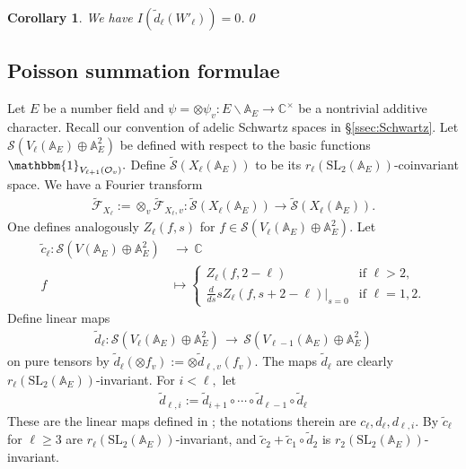\documentclass[11pt,a4paper,reqno]{amsart}
\newtheorem{cor}[thm]{Corollary}
\theoremstyle{remark}
\numberwithin{equation}{section}
\newcommand{\A}{\mathbb{A}}
\newcommand{\SL}{\mathrm{SL}}
\newcommand{\lto}{\,\longrightarrow\,}
\newcommand{\lmto}{\longmapsto}
\newcommand{\OO}{\mathcal{O}}
\newcommand{\CC}{\mathbb{C}}
\theoremstyle{definition}
\numberwithin{equation}{section}
\newcommand{\one}{\mathbbm{1}}
\begin{document}
\begin{cor}\label{eq:dvanish}
    We have $I(\tilde{d}_\ell(W'_\ell))=0$.\qed
\end{cor}




\subsection{Poisson summation formulae}

Let $E$ be a number field and $\psi=\otimes \psi_v:E\backslash \A_E\to \CC^\times$ be a nontrivial additive character. Recall our convention of adelic Schwartz spaces in \S \ref{ssec:Schwartz}. Let $\mathcal{S}(V_{\ell}(\A_E)\oplus \A_E^2)$ be defined with respect to the basic functions $\one_{V_{\ell+1}(\OO_v)}.$ Define $\widetilde{\mathcal{S}}(X_{\ell}(\A_E))$ to be its $r_\ell(\SL_2(\A_E))$-coinvariant space. We have a Fourier transform
\begin{align*}
    \widetilde{\mathcal{F}}_{X_\ell}:=\otimes_v \widetilde{\mathcal{F}}_{X_\ell,v}:\widetilde{\mathcal{S}}(X_{\ell}(\A_E))\longrightarrow\widetilde{\mathcal{S}}(X_{\ell}(\A_E)).
\end{align*}
One defines analogously $Z_{\ell}(f,s)$ for $f\in \mathcal{S}(V_{\ell}(\A_E)\oplus \A_E^2).$ Let
\begin{align*}
    \tilde{c}_\ell:\mathcal{S}(V(\A_E)\oplus \A_E^2)&\lto \CC\\
    f&\lmto\begin{cases}
        Z_{\ell}(f,2-\ell) & \textrm{if } \ell>2,\\
        \frac{d}{ds}sZ_{\ell}(f,s+2-\ell)\bigg|_{s=0} & \textrm{if } \ell={1,2}.
    \end{cases}
\end{align*}
Define linear maps
\begin{align*}
    \tilde{d}_\ell:\mathcal{S}(V_\ell(\A_E)\oplus \A_E^2)\lto \mathcal{S}(V_{\ell-1}(\A_E)\oplus \A_E^2)
\end{align*}
on pure tensors by $\tilde{d}_\ell(\otimes f_v):=\otimes \tilde{d}_{\ell,v}(f_v)$. The maps $\tilde{d}_\ell$ are clearly $r_\ell(\SL_2(\A_E))$-invariant. For $i< \ell,$ let
\begin{align*}
    \tilde{d}_{\ell,i}:=\tilde{d}_{i+1}\circ \cdots\circ \tilde{d}_{\ell-1}\circ \tilde{d}_\ell
\end{align*}
These are the linear maps defined in \cite{Getz:Quad}; the notations therein are $c_\ell, d_\ell,d_{\ell,i}$. By \cite[Theorem 7.1]{Getz:Quad} $\tilde{c}_\ell$ for $\ell\ge 3$ are $r_\ell(\SL_2(\A_E))$-invariant, and $\tilde{c}_2+\tilde{c}_1\circ \tilde{d}_2$ is $r_2(\SL_2(\A_E))$-invariant. 
 
\end{document}
